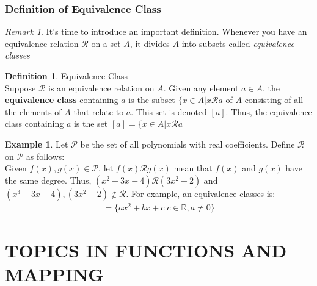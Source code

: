 \documentclass{book}
\theoremstyle{definition}
\newtheorem{definition}{Definition}[section]
\newtheorem{example}{Example}[definition]
\theoremstyle{remark}
\newtheorem{remark}{Remark}
\newcommand{\bb}[1]{\mathbb{#1}}
\newcommand{\cc}[1]{\mathcal{#1}}
\begin{document}
\newpage
\subsection{Definition of Equivalence Class}

    \begin{remark}
        It's time to introduce an important definition. Whenever you have an equivalence relation $\cc{R}$ on a set $A$, it divides $A$ into subsets called \textit{equivalence classes}
    \end{remark}
    
    \begin{tcolorbox}
        \begin{definition}
            Equivalence Class \\
            
            Suppose $\cc{R}$ is an equivalence relation on $A$. Given any element $a \in A$, the \textbf{equivalence class} containing $a$ is the subset $\{ x \in A | x \cc{R} a$ of $A$ consisting of all the elements of $A$ that relate to $a$. This set is denoted $[a]$. Thus, the equivalence class containing $a$ is the set $[a] = \{ x \in A | x \cc{R} a$
        \end{definition}
    \end{tcolorbox}
    
    \begin{example}
        Let $\cc{P}$ be the set of all polynomials with real coefficients. Define $\cc{R}$ on $\cc{P}$ as follows: \\
        
        Given $f(x), g(x) \in \cc{P}$, let $f(x) \cc{R} g(x)$ mean that $f(x)$ and $g(x)$ have the same degree. Thus, $(x^2 + 3x - 4) \cc{R} (3x^2 - 2)$ and $(x^3 + 3x - 4), (3x^2 - 2) \notin \cc{R}$. For example, an equivalence classes is: 
            \begin{align*}
                [x^3 + 3x - 4] = \{ ax^2 + bx + c | c \in \bb{R}, a \neq 0 \}
            \end{align*}
        
    \end{example}










\newpage
\chapter{TOPICS IN FUNCTIONS AND MAPPING}
\end{document}
